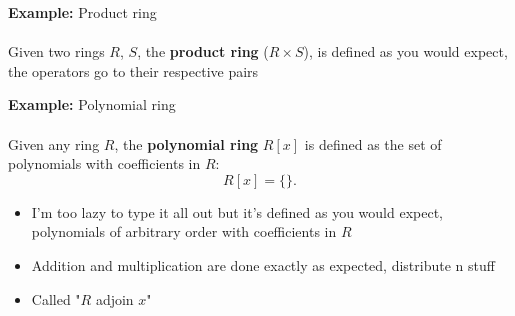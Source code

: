 \documentclass{article}
\begin{document}
\begin{example} 
\textbf{Example:} Product ring \\
~\\
Given two rings $R$, $S$, the {\color{blue} \textbf{product ring}} ($R \times S$), is defined as you would expect, the operators go to their respective pairs
\end{example}
\begin{example} 
\textbf{Example:} Polynomial ring \\
~\\
Given any ring $R$, the {\color{blue} \textbf{polynomial ring}} $R\left[x\right]$ is defined as the set of polynomials with coefficients in $R$: 
\[
	R\left[x\right] = \{ \}
.\] 
\begin{itemize}
	\item I'm  too lazy to type it all out but it's defined as you would expect, polynomials of arbitrary order with coefficients in $R$
	\item Addition and multiplication are done exactly as expected, distribute n stuff
	\item Called "$R$ adjoin $x$"
\end{itemize}

\end{example}
\end{document}
